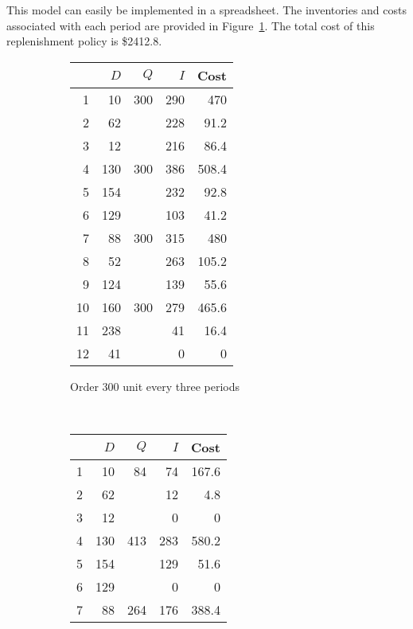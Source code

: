 \begin{solution}
This model can easily be implemented in a spreadsheet. The inventories and costs associated with each period are provided in Figure~\ref{fig:3300}. The total cost of this replenishment policy is \$2412.8.

\begin{figure}[htbp]
\begin{subfigure}[b]{0.5\textwidth}
  \centering
    \begin{tabular}{rrrrr}
    \toprule
          & $D$ & $Q$ & $I$ & Cost \\
	\midrule
    1     & 10    & 300   & 290   & 470 \\
    2     & 62    &       & 228   & 91.2 \\
    3     & 12    &       & 216   & 86.4 \\
    4     & 130   & 300   & 386   & 508.4 \\
    5     & 154   &       & 232   & 92.8 \\
    6     & 129   &       & 103   & 41.2 \\
    7     & 88    & 300   & 315   & 480 \\
    8     & 52    &       & 263   & 105.2 \\
    9     & 124   &       & 139   & 55.6 \\
    10    & 160   & 300   & 279   & 465.6 \\
    11    & 238   &       & 41    & 16.4 \\
    12    & 41    &       & 0     & 0 \\
    \bottomrule
    \end{tabular}%
\caption{Order 300 unit every three periods}
\label{fig:3300}
\end{subfigure}
~
\begin{subfigure}[b]{0.5\textwidth}
  \centering
    \begin{tabular}{rrrrr}
    \toprule
          & $D$ & $Q$ & $I$ & Cost \\
	\midrule
    1     & 10    & 84    & 74    & 167.6 \\
    2     & 62    &       & 12    & 4.8 \\
    3     & 12    &       & 0     & 0 \\
    4     & 130   & 413   & 283   & 580.2 \\
    5     & 154   &       & 129   & 51.6 \\
    6     & 129   &       & 0     & 0 \\
    7     & 88    & 264   & 176   & 388.4 \\

\end{tabular}
\end{subfigure}
\end{figure}
\end{solution}

